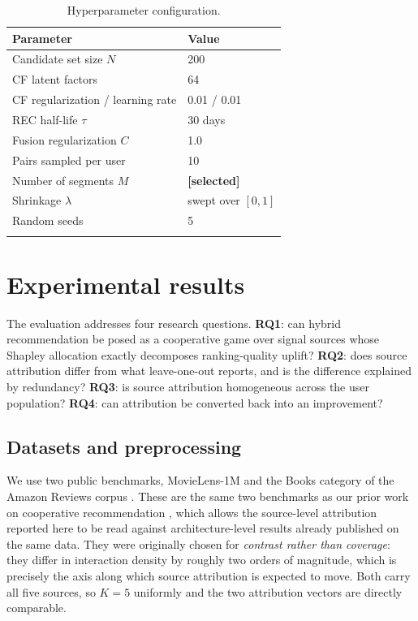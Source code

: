 \documentclass[pdflatex,sn-mathphys-num]{sn-jnl}%
\theoremstyle{thmstyleone}%
\theoremstyle{thmstyletwo}%
\theoremstyle{thmstylethree}%
\newcommand{\tbd}[1]{\textbf{[#1]}}
\begin{document}
\begin{table}[t]
\caption{Hyperparameter configuration.}\label{tab10}
\begin{tabular}{@{}ll@{}}
\toprule
Parameter & Value \\
\midrule
Candidate set size $N$              & 200 \\
CF latent factors                   & 64 \\
CF regularization / learning rate   & 0.01 / 0.01 \\
REC half-life $\tau$                & 30 days \\
Fusion regularization $C$           & 1.0 \\
Pairs sampled per user              & 10 \\
Number of segments $M$              & \tbd{selected} \\
Shrinkage $\lambda$                 & swept over $[0,1]$ \\
Random seeds                        & 5 \\
\botrule
\end{tabular}
\end{table}

\section{Experimental results}\label{sec4}

The evaluation addresses four research questions. \textbf{RQ1}: can hybrid recommendation be posed as a cooperative game over signal sources whose Shapley allocation exactly decomposes ranking-quality uplift? \textbf{RQ2}: does source attribution differ from what leave-one-out reports, and is the difference explained by redundancy? \textbf{RQ3}: is source attribution homogeneous across the user population? \textbf{RQ4}: can attribution be converted back into an improvement?

\subsection{Datasets and preprocessing}\label{subsec4_1}

We use two public benchmarks, MovieLens-1M \cite{harper2015} and the Books category of the Amazon Reviews corpus \cite{ni2019}. These are the same two benchmarks as our prior work on cooperative recommendation \cite{louhichi2026}, which allows the source-level attribution reported here to be read against architecture-level results already published on the same data. They were originally chosen for \emph{contrast rather than coverage}: they differ in interaction density by roughly two orders of magnitude, which is precisely the axis along which source attribution is expected to move. Both carry all five sources, so $K=5$ uniformly and the two attribution vectors are directly comparable.
\end{document}
